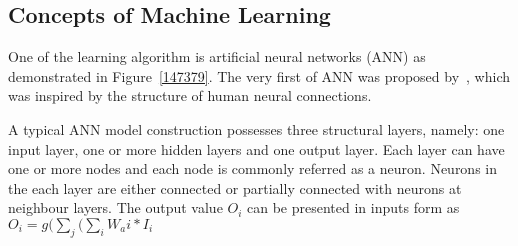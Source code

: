 \subsection{Concepts of Machine Learning}
One of the learning algorithm is artificial neural networks (ANN) as demonstrated in Figure~\ref{147379}. The very first of ANN was proposed by~\citet{McCulloch_1943}, which was inspired by the structure of human neural connections. 
\par 
A typical ANN model construction possesses three structural layers, namely: one input layer, one or more hidden layers and one output layer. Each layer can have one or more nodes and each node is commonly referred as a neuron. Neurons in the each layer are either connected or partially connected with neurons at neighbour layers. The output value $O_i$ can be presented in inputs form as
$O_i = g( \sum_{j} (\sum_{i} W_ai * I_i$